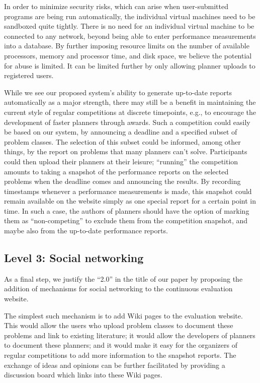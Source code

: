 In order to minimize security risks, which can arise when user-submitted
programs are being run automatically, the individual virtual
machines need to be sandboxed quite tightly.  There is no need for an
individual virtual machine to be connected to any network, beyond
being able to enter performance measurements into a database.  By
further imposing resource limits on the number of available
processors, memory and processor time, and disk space, we believe the
potential for abuse is limited.  It can be limited further by only
allowing planner uploads to registered users.

While we see our proposed system's ability to generate up-to-date
reports automatically as a major strength, there may still be a
benefit in maintaining the current style of regular competitions at
discrete timepoints, e.g., to encourage the development of faster
planners through awards.  Such a competition could easily be based on
our system, by announcing a deadline and a specified subset of problem
classes. The selection of this subset could be informed, among other
things, by the report on problems that many planners can't
solve. Participants could then upload their planners at their leisure;
``running'' the competition amounts to taking a snapshot of the
performance reports on the selected problems when the deadline comes
and announcing the results.  By recording timestamps whenever a
performance measurements is made, this snapshot could remain available
on the website simply as one special report for a certain point in
time.  In such a case, the authors of planners should have the option
of marking them as ``non-competing'' to exclude them from the
competition snapshot, and maybe also from the up-to-date performance
reports.



\subsection{Level 3: Social networking}

As a final step, we justify the ``2.0'' in the title of our paper by
proposing the addition of mechanisms for social networking to the
continuous evaluation website.

The simplest such mechanism is to add Wiki pages to the evaluation
website.  This would allow the users who upload problem classes to
document these problems and link to existing literature; it would
allow the developers of planners to document these planners; and it
would make it easy for the organizers of regular competitions to add
more information to the snapshot reports.  The exchange of ideas and
opinions can be further facilitated by providing a discussion board
which links into these Wiki pages.

